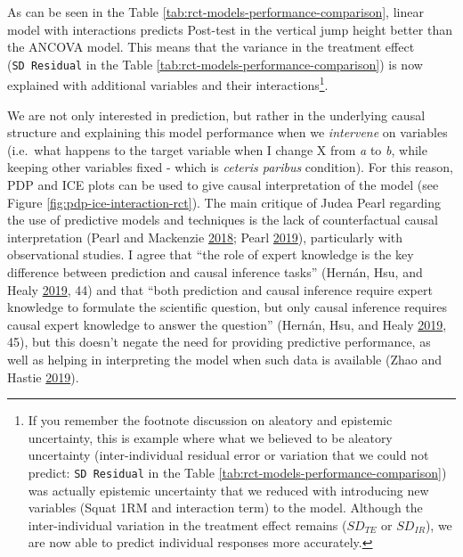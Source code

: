 \documentclass[
]{book}
\begin{document}
As can be seen in the Table \ref{tab:rct-models-performance-comparison}, linear model with interactions predicts Post-test in the vertical jump height better than the ANCOVA model. This means that the variance in the treatment effect (\texttt{SD\ Residual} in the Table \ref{tab:rct-models-performance-comparison}) is now explained with additional variables and their interactions\footnote{If you remember the footnote discussion on aleatory and epistemic uncertainty, this is example where what we believed to be aleatory uncertainty (inter-individual residual error or variation that we could not predict: \texttt{SD\ Residual} in the Table \ref{tab:rct-models-performance-comparison}) was actually epistemic uncertainty that we reduced with introducing new variables (Squat 1RM and interaction term) to the model. Although the inter-individual variation in the treatment effect remains (\(SD_{TE}\) or \(SD_{IR}\)), we are now able to predict individual responses more accurately.}.

We are not only interested in prediction, but rather in the underlying causal structure and explaining this model performance when we \emph{intervene} on variables (i.e.~what happens to the target variable when I change X from \emph{a} to \emph{b}, while keeping other variables fixed - which is \emph{ceteris paribus} condition). For this reason, PDP and ICE plots can be used to give causal interpretation of the model (see Figure \ref{fig:pdp-ice-interaction-rct}).
The main critique of Judea Pearl regarding the use of predictive models and techniques is the lack of counterfactual causal interpretation (Pearl and Mackenzie \protect\hyperlink{ref-pearlBookWhyNew2018}{2018}; Pearl \protect\hyperlink{ref-pearlSevenToolsCausal2019}{2019}), particularly with observational studies. I agree that ``the role of expert knowledge is the key difference between prediction and causal inference tasks'' (Hernán, Hsu, and Healy \protect\hyperlink{ref-hernanSecondChanceGet2019}{2019}, 44) and that ``both prediction and causal inference require expert knowledge to formulate the scientific question, but only causal inference requires causal expert knowledge to answer the question'' (Hernán, Hsu, and Healy \protect\hyperlink{ref-hernanSecondChanceGet2019}{2019}, 45), but this doesn't negate the need for providing predictive performance, as well as helping in interpreting the model when such data is available (Zhao and Hastie \protect\hyperlink{ref-zhaoCausalInterpretationsBlackBox2019}{2019}).
\end{document}
